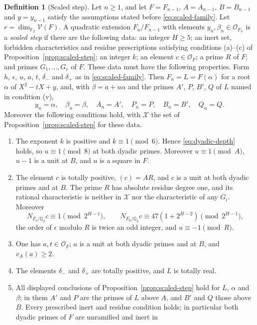 \documentclass[11pt]{article}
\theoremstyle{plain}
\theoremstyle{definition}
\newtheorem{definition}[theorem]{Definition}
\theoremstyle{remark}
\newcommand{\Q}{\mathbb Q}
\newcommand{\F}{\mathbb F}
\newcommand{\OO}{\mathcal O}
\begin{document}
\begin{definition}[Scaled step]\label{def:scaled-step}
Let $n\ge1$, and let $F=F_{n-1}$, $A=A_{n-1}$, $B=B_{n-1}$ and
$y=y_{n-1}$ satisfy the assumptions stated before
\eqref{eq:scaled-family}.  Let $r=\dim_{\F_2}\mathcal V(F)$.  A
quadratic extension $F_n/F_{n-1}$ with elements
$y_n,\beta_n\in\OO_{F_n}$ is a \emph{scaled step} if there are the
following data: an integer $H\ge5$; an inert set, forbidden
characteristics and residue prescriptions satisfying conditions
(a)--(c) of Proposition~\ref{prop:scaled-step}; an integer $k$; an
element $c\in\OO_F$; a prime $R$ of $F$; and primes $G_1,\dots,G_r$ of
$F$.  These data must have the following properties.  Form $h$,
$\epsilon$, $u$, $a$, $t$, $\delta_-$ and $\delta_+$ as in
\eqref{eq:scaled-family}.  Then $F_n=L=F(\alpha)$ for a root $\alpha$
of $X^2-tX+y$, and, with $\beta=a+u\alpha$ and the primes $A'$, $P$,
$B'$, $Q$ of $L$ named in condition (v),
\[
 y_n=\alpha,\quad \beta_n=\beta,\quad
 A_n=A',\quad P_n=P,\quad B_n=B',\quad Q_n=Q.
\]
Moreover the following conditions hold, with $\mathcal X$ the set of
Proposition~\ref{prop:scaled-step} for these data.
\begin{enumerate}
\item[(i)] The exponent $k$ is positive and $k\equiv1\pmod6$.  Hence
\eqref{eq:dyadic-depth} holds, so $u\equiv1\pmod8$ at both dyadic
primes.  Moreover $u\equiv1\pmod A$, $u-1$ is a unit at $B$, and $u$
is a square in $F$.
\item[(ii)] The element $c$ is totally positive, $(c)=AR$, and $c$ is
a unit at both dyadic primes and at $B$.  The prime $R$ has absolute
residue degree one, and its rational characteristic is neither in
$\mathcal X$ nor the characteristic of any $G_i$.  Moreover
\[
 N_{F_{\mathfrak e}/\Q_2}c\equiv1\pmod{2^{H-1}},\qquad
 N_{F_{\mathfrak d}/\Q_2}c\equiv47(1+2^{H-2})\pmod{2^{H-1}},
\]
the order of $\epsilon$ modulo $R$ is twice an odd integer, and
$u\equiv-1\pmod R$.
\item[(iii)] One has $a,t\in\OO_F$; $a$ is a unit at both dyadic
primes and at $B$, and $v_A(a)\ge2$.
\item[(iv)] The elements $\delta_-$ and $\delta_+$ are totally positive,
and $L$ is totally real.
\item[(v)] All displayed conclusions of
Proposition~\ref{prop:scaled-step} hold for $L$, $\alpha$ and $\beta$;
in them $A'$ and $P$ are the primes of $L$ above $A$, and $B'$ and $Q$
those above $B$.  Every prescribed inert and residue condition holds;
in particular both dyadic primes of $F$ are unramified and inert in

\end{enumerate}
\end{definition}
\end{document}
